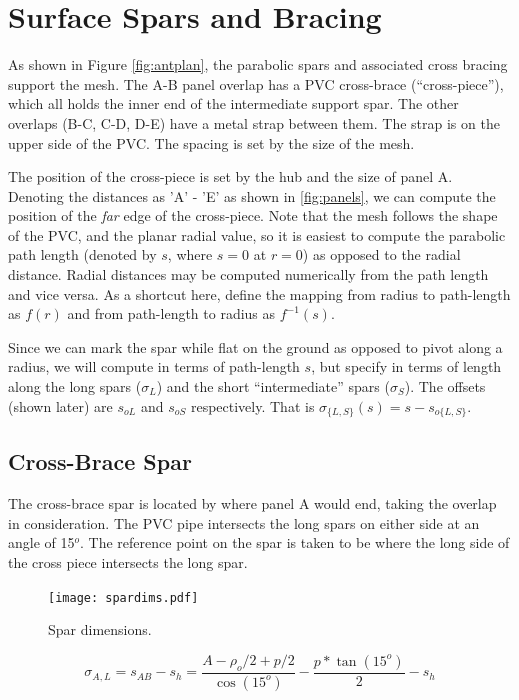 \documentclass{article}
\begin{document}
\section{Surface Spars and Bracing}
As shown in Figure \ref{fig:antplan}, the parabolic spars and associated cross bracing support the mesh.  The A-B panel overlap has a PVC cross-brace (``cross-piece''), which all holds the inner end of the intermediate support spar.  The other overlaps (B-C, C-D, D-E) have a metal strap between them. The strap is on the upper side of the PVC.  The spacing is set by the size of the mesh.

The position of the cross-piece is set by the hub and the size of panel A.  Denoting the distances as 'A' - 'E' as shown in \ref{fig:panels}, we can compute the position of the {\em far} edge of the cross-piece.  Note that the mesh follows the shape of the PVC, and the planar radial value, so it is easiest to compute the parabolic path length (denoted  by $s$, where $s=0$ at $r=0$) as opposed to the radial distance.  Radial distances may be computed numerically from the path length and vice versa.  As a shortcut here, define the mapping from radius to path-length as $f(r)$ and from path-length to radius as $f^{-1}(s)$.

Since we can mark the spar while flat on the ground as opposed to pivot along a radius, we will compute in terms of path-length $s$, but specify in terms of length along the long spars ($\sigma_L$) and the short ``intermediate'' spars ($\sigma_S$).  The offsets (shown later) are $s_{oL}$ and $s_{oS}$ respectively. That is $\sigma_{\{L,S\}}(s) = s - s_{o\{L,S\}}$. 

\subsection{Cross-Brace Spar}
The cross-brace spar is located by where panel A would end, taking the overlap in consideration.  The PVC pipe intersects the long spars on either side at an angle of 15$^o$.  The reference point on the spar is taken to be where the long side of the cross piece intersects the long spar.
\begin{figure}[H]
\texttt{[image: spardims.pdf]}
\centering
\vspace{-.15in}
\caption{Spar dimensions.}
\label{fig:spardims}
\end{figure}
\begin{equation}
\sigma_{A,L} = s_{AB} - s_h = \frac{A - \rho_o/2 + p/2}{\cos(15^o)} - \frac{p*\tan(15^o)}{2} - s_h
\end{equation}
\end{document}

